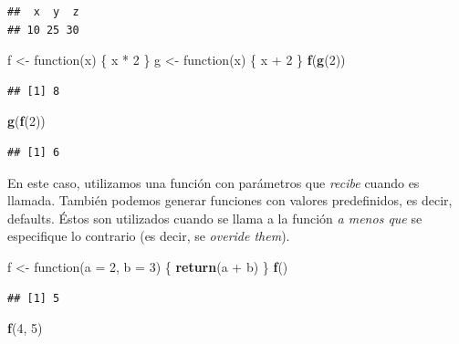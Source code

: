 \documentclass[]{article}
\newenvironment{Shaded}{\begin{snugshade}}{\end{snugshade}}
\newcommand{\KeywordTok}[1]{\textcolor[rgb]{0.13,0.29,0.53}{\textbf{{#1}}}}
\newcommand{\DataTypeTok}[1]{\textcolor[rgb]{0.13,0.29,0.53}{{#1}}}
\newcommand{\DecValTok}[1]{\textcolor[rgb]{0.00,0.00,0.81}{{#1}}}
\newcommand{\StringTok}[1]{\textcolor[rgb]{0.31,0.60,0.02}{{#1}}}
\newcommand{\NormalTok}[1]{{#1}}
\begin{document}
\begin{verbatim}
##  x  y  z 
## 10 25 30
\end{verbatim}

\begin{Shaded}
\begin{Highlighting}[]
\NormalTok{f <-}\StringTok{ }\NormalTok{function(x) \{}
  \NormalTok{x *}\StringTok{ }\DecValTok{2}
\NormalTok{\}}
\NormalTok{g <-}\StringTok{ }\NormalTok{function(x) \{}
  \NormalTok{x +}\StringTok{ }\DecValTok{2}
\NormalTok{\}}
\KeywordTok{f}\NormalTok{(}\KeywordTok{g}\NormalTok{(}\DecValTok{2}\NormalTok{))}
\end{Highlighting}
\end{Shaded}

\begin{verbatim}
## [1] 8
\end{verbatim}

\begin{Shaded}
\begin{Highlighting}[]
\KeywordTok{g}\NormalTok{(}\KeywordTok{f}\NormalTok{(}\DecValTok{2}\NormalTok{))}
\end{Highlighting}
\end{Shaded}

\begin{verbatim}
## [1] 6
\end{verbatim}

En este caso, utilizamos una función con parámetros que \emph{recibe}
cuando es llamada. También podemos generar funciones con valores
predefinidos, es decir, defaults. Éstos son utilizados cuando se llama a
la función \emph{a menos que} se especifique lo contrario (es decir, se
\emph{overide them}).

\begin{Shaded}
\begin{Highlighting}[]
\NormalTok{f <-}\StringTok{ }\NormalTok{function(}\DataTypeTok{a =} \DecValTok{2}\NormalTok{, }\DataTypeTok{b =} \DecValTok{3}\NormalTok{) \{}
  \KeywordTok{return}\NormalTok{(a +}\StringTok{ }\NormalTok{b)}
\NormalTok{\}}
\KeywordTok{f}\NormalTok{()}
\end{Highlighting}
\end{Shaded}

\begin{verbatim}
## [1] 5
\end{verbatim}

\begin{Shaded}
\begin{Highlighting}[]
\KeywordTok{f}\NormalTok{(}\DecValTok{4}\NormalTok{, }\DecValTok{5}\NormalTok{)}
\end{Highlighting}
\end{Shaded}
\end{document}
